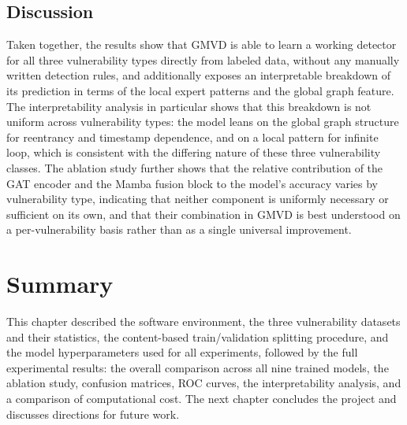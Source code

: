 \documentclass[12pt, a4paper, openright, twoside]{report}
\begin{document}
\subsection{Discussion}

Taken together, the results show that GMVD is able to learn a working detector for all three vulnerability types directly from labeled data, without any manually written detection rules, and additionally exposes an interpretable breakdown of its prediction in terms of the local expert patterns and the global graph feature. The interpretability analysis in particular shows that this breakdown is not uniform across vulnerability types: the model leans on the global graph structure for reentrancy and timestamp dependence, and on a local pattern for infinite loop, which is consistent with the differing nature of these three vulnerability classes. The ablation study further shows that the relative contribution of the GAT encoder and the Mamba fusion block to the model's accuracy varies by vulnerability type, indicating that neither component is uniformly necessary or sufficient on its own, and that their combination in GMVD is best understood on a per-vulnerability basis rather than as a single universal improvement.

\section{Summary}
This chapter described the software environment, the three vulnerability datasets and their statistics, the content-based train/validation splitting procedure, and the model hyperparameters used for all experiments, followed by the full experimental results: the overall comparison across all nine trained models, the ablation study, confusion matrices, ROC curves, the interpretability analysis, and a comparison of computational cost. The next chapter concludes the project and discusses directions for future work.
\end{document}
